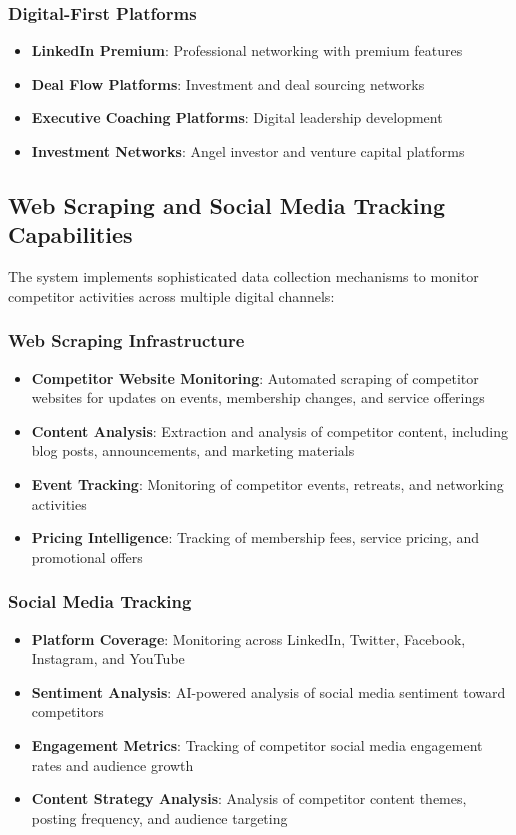 \subsubsection{Digital-First Platforms}
\begin{itemize}
    \item \textbf{LinkedIn Premium}: Professional networking with premium features
    \item \textbf{Deal Flow Platforms}: Investment and deal sourcing networks
    \item \textbf{Executive Coaching Platforms}: Digital leadership development
    \item \textbf{Investment Networks}: Angel investor and venture capital platforms
\end{itemize}

\subsection{Web Scraping and Social Media Tracking Capabilities}

The system implements sophisticated data collection mechanisms to monitor competitor activities across multiple digital channels:

\subsubsection{Web Scraping Infrastructure}
\begin{itemize}
    \item \textbf{Competitor Website Monitoring}: Automated scraping of competitor websites for updates on events, membership changes, and service offerings
    \item \textbf{Content Analysis}: Extraction and analysis of competitor content, including blog posts, announcements, and marketing materials
    \item \textbf{Event Tracking}: Monitoring of competitor events, retreats, and networking activities
    \item \textbf{Pricing Intelligence}: Tracking of membership fees, service pricing, and promotional offers
\end{itemize}

\subsubsection{Social Media Tracking}
\begin{itemize}
    \item \textbf{Platform Coverage}: Monitoring across LinkedIn, Twitter, Facebook, Instagram, and YouTube
    \item \textbf{Sentiment Analysis}: AI-powered analysis of social media sentiment toward competitors
    \item \textbf{Engagement Metrics}: Tracking of competitor social media engagement rates and audience growth
    \item \textbf{Content Strategy Analysis}: Analysis of competitor content themes, posting frequency, and audience targeting
\end{itemize}

